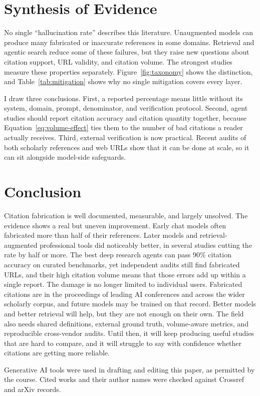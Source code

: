 \documentclass[acmsmall,screen]{acmart}
\begin{document}
\section{Synthesis of Evidence}\label{sec:synthesis}
No single ``hallucination rate'' describes this literature. Unaugmented models can produce many fabricated or inaccurate references in some domains. Retrieval and agentic search reduce some of these failures, but they raise new questions about citation support, URL validity, and citation volume. The strongest studies measure these properties separately. Figure~\ref{fig:taxonomy} shows the distinction, and Table~\ref{tab:mitigation} shows why no single mitigation covers every layer.

I draw three conclusions. First, a reported percentage means little without its system, domain, prompt, denominator, and verification protocol. Second, agent studies should report citation accuracy and citation quantity together, because Equation~\eqref{eq:volume-effect} ties them to the number of bad citations a reader actually receives. Third, external verification is now practical. Recent audits of both scholarly references and web URLs show that it can be done at scale, so it can sit alongside model-side safeguards.

\section{Conclusion}\label{sec:conclusion}
Citation fabrication is well documented, measurable, and largely unsolved. The evidence shows a real but uneven improvement. Early chat models often fabricated more than half of their references. Later models and retrieval-augmented professional tools did noticeably better, in several studies cutting the rate by half or more. The best deep research agents can pass 90\% citation accuracy on curated benchmarks, yet independent audits still find fabricated URLs, and their high citation volume means that those errors add up within a single report. The damage is no longer limited to individual users. Fabricated citations are in the proceedings of leading AI conferences and across the wider scholarly corpus, and future models may be trained on that record. Better models and better retrieval will help, but they are not enough on their own. The field also needs shared definitions, external ground truth, volume-aware metrics, and reproducible cross-vendor audits. Until then, it will keep producing useful studies that are hard to compare, and it will struggle to say with confidence whether citations are getting more reliable.

\begin{acks}
Generative AI tools were used in drafting and editing this paper, as permitted by the course. Cited works and their author names were checked against Crossref and arXiv records.
\end{acks}



\end{document}
